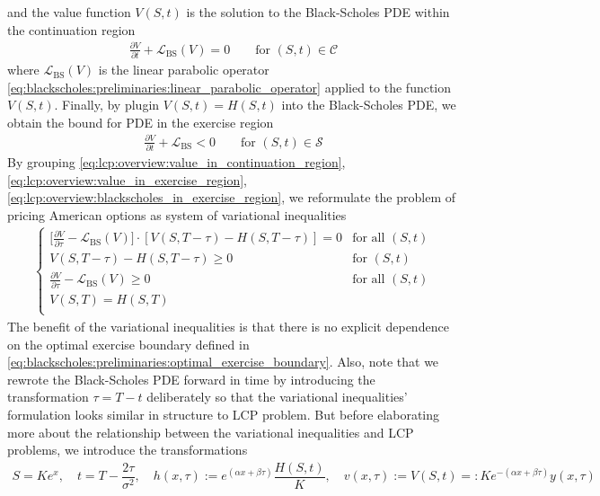 and the value function $V(S,t)$ is the solution to the Black-Scholes PDE  within the continuation region
\begin{align*}
    \frac{\partial{V}}{\partial{t}} + \mathcal{L}_{\text{BS}}(V) = 0 \qquad \text{for $(S,t) \in \mathcal{C}$}
\end{align*}
where $\mathcal{L}_{\text{BS}}(V)$ is the linear parabolic operator \eqref{eq:blackscholes:preliminaries:linear_parabolic_operator} applied to the function $V(S,t)$. Finally, by plugin $V(S,t)=H(S,t)$ into the Black-Scholes PDE, we obtain the bound for PDE in the exercise region
\begin{align}
    \label{eq:lcp:overview:blackscholes_in_exercise_region}
    \frac{\partial{V}}{\partial{t}} + \mathcal{L}_{\text{BS}} < 0 \qquad \text{for $(S,t) \in \mathcal{S}$}
\end{align}
By grouping \eqref{eq:lcp:overview:value_in_continuation_region}, \eqref{eq:lcp:overview:value_in_exercise_region}, \eqref{eq:lcp:overview:blackscholes_in_exercise_region}, we reformulate the problem of pricing American options as system of variational inequalities
\begin{align}
  \begin{cases}
    \big[\frac{\partial V}{\partial \tau} - \mathcal{L}_{\text{BS}}(V)\big] \cdot [V(S,T-\tau) - H(S,T-\tau)] = 0 & \text{for all $(S,t)$} \\
    V(S, T-\tau) - H(S, T-\tau) \ge 0 & \text{for $(S, t) \ $}\\
    \frac{\partial V}{\partial \tau} - \mathcal{L}_{\text{BS}}(V) \ge 0 &  \text{for all $(S, t)$}\\
    V(S, T) = H(S, T) \\  
  \end{cases}
  \label{eq:lcp:overview:variational_inequalities}
\end{align}
The benefit of the variational inequalities is that there is no explicit dependence on the optimal exercise boundary defined in \eqref{eq:blackscholes:preliminaries:optimal_exercise_boundary}. Also, note that we rewrote the Black-Scholes PDE forward in time by introducing the transformation $\tau = T - t$ deliberately so that the variational inequalities' formulation looks similar in structure to LCP problem. But before elaborating more about the relationship between the variational inequalities and LCP problems, we introduce the transformations
\begin{align}
\label{eq:lcp:overview:heat_diffusion_domain_transformation}
S = Ke^x, \quad t = T - \dfrac{2\tau}{\sigma^2},\quad h(x,\tau) := e^{(\alpha x + \beta \tau)}\dfrac{H(S,t)}{K}, \quad v(x, \tau) := V(S, t) =: Ke^{-(\alpha x + \beta \tau)}y(x, \tau)
\end{align}
